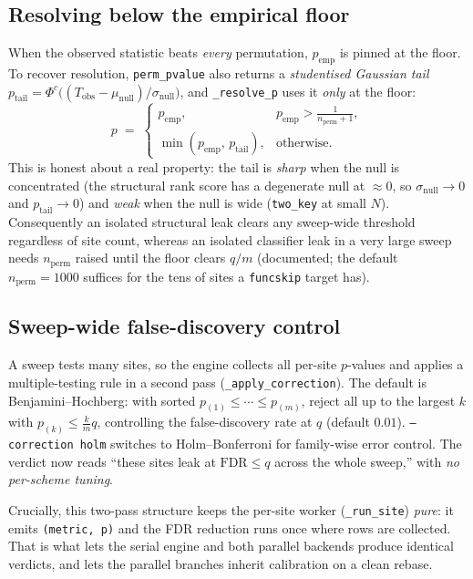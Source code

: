 \documentclass[11pt]{article}
\newcommand{\code}[1]{\texttt{#1}}
\begin{document}
\subsection{Resolving below the empirical floor}
When the observed statistic beats \emph{every} permutation, $p_{\text{emp}}$ is
pinned at the floor. To recover resolution, \code{perm\_pvalue} also returns a
\emph{studentised Gaussian tail}
$p_{\text{tail}}=\Phi^{c}\!\big((T_{\text{obs}}-\mu_{\text{null}})/
\sigma_{\text{null}}\big)$, and \code{\_resolve\_p} uses it \emph{only} at the
floor:
\[
  p \;=\;
  \begin{cases}
    p_{\text{emp}}, & p_{\text{emp}}>\tfrac{1}{n_{\text{perm}}+1},\\[2pt]
    \min(p_{\text{emp}},\,p_{\text{tail}}), & \text{otherwise.}
  \end{cases}
\]
This is honest about a real property: the tail is \emph{sharp} when the null is
concentrated (the structural rank score has a degenerate null at $\approx 0$, so
$\sigma_{\text{null}}\!\to\!0$ and $p_{\text{tail}}\!\to\!0$) and \emph{weak} when the
null is wide (\code{two\_key} at small $N$). Consequently an isolated structural
leak clears any sweep-wide threshold regardless of site count, whereas an isolated
classifier leak in a very large sweep needs $n_{\text{perm}}$ raised until the floor
clears $q/m$ (documented; the default $n_{\text{perm}}=1000$ suffices for the tens of
sites a \code{funcskip} target has).

\subsection{Sweep-wide false-discovery control}
A sweep tests many sites, so the engine collects all per-site $p$-values and applies
a multiple-testing rule in a second pass (\code{\_apply\_correction}). The default is
Benjamini--Hochberg: with sorted $p_{(1)}\le\cdots\le p_{(m)}$, reject all up to the
largest $k$ with $p_{(k)}\le \tfrac{k}{m}q$, controlling the false-discovery rate at
$q$ (default $0.01$). \code{--correction holm} switches to Holm--Bonferroni for
family-wise error control. The verdict now reads ``these sites leak at
$\text{FDR}\le q$ across the whole sweep,'' with \emph{no per-scheme tuning}.

Crucially, this two-pass structure keeps the per-site worker (\code{\_run\_site})
\emph{pure}: it emits \code{(metric, p)} and the FDR reduction runs once where rows
are collected. That is what lets the serial engine and both parallel backends
produce identical verdicts, and lets the parallel branches inherit calibration on a
clean rebase.
\end{document}
